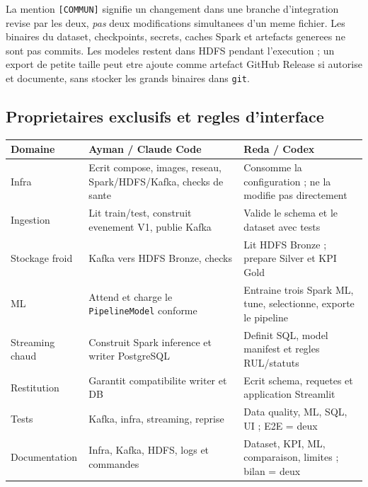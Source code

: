 \documentclass[10pt,a4paper]{article}
\newcommand{\code}[1]{{\small\ttfamily\nolinkurl{#1}}}
\begin{document}
La mention \code{[COMMUN]} signifie un changement dans une branche d'integration revise par les deux, \emph{pas} deux modifications simultanees d'un meme fichier. Les binaires du dataset, checkpoints, secrets, caches Spark et artefacts generees ne sont pas commits. Les modeles restent dans HDFS pendant l'execution ; un export de petite taille peut etre ajoute comme artefact GitHub Release si autorise et documente, sans stocker les grands binaires dans \code{git}.

\subsection{Proprietaires exclusifs et regles d'interface}
\begin{tabularx}{\linewidth}{@{}p{28mm}Y Y@{}}
\toprule
\textbf{Domaine} & \textbf{Ayman / Claude Code} & \textbf{Reda / Codex}\\\midrule
Infra & Ecrit compose, images, reseau, Spark/HDFS/Kafka, checks de sante & Consomme la configuration ; ne la modifie pas directement\\
Ingestion & Lit train/test, construit evenement V1, publie Kafka & Valide le schema et le dataset avec tests\\
Stockage froid & Kafka vers HDFS Bronze, checks & Lit HDFS Bronze ; prepare Silver et KPI Gold\\
ML & Attend et charge le \code{PipelineModel} conforme & Entraine trois Spark ML, tune, selectionne, exporte le pipeline\\
Streaming chaud & Construit Spark inference et writer PostgreSQL & Definit SQL, model manifest et regles RUL/statuts\\
Restitution & Garantit compatibilite writer et DB & Ecrit schema, requetes et application Streamlit\\
Tests & Kafka, infra, streaming, reprise & Data quality, ML, SQL, UI ; E2E = deux\\
Documentation & Infra, Kafka, HDFS, logs et commandes & Dataset, KPI, ML, comparaison, limites ; bilan = deux\\
\bottomrule
\end{tabularx}
\end{document}
